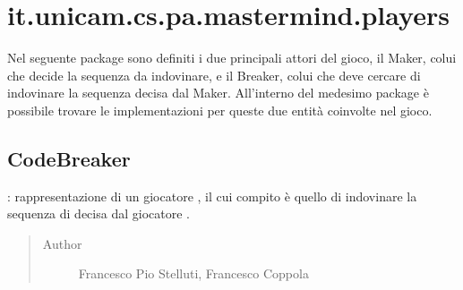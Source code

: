 \documentclass[letterpaper,10pt,italian,openany,oneside]{sphinxmanual}
\begin{document}
\section{it.unicam.cs.pa.mastermind.players}
\label{\detokenize{test/it/unicam/cs/pa/mastermind/players/package-index:it-unicam-cs-pa-mastermind-players}}\label{\detokenize{test/it/unicam/cs/pa/mastermind/players/package-index::doc}}
Nel seguente package sono definiti i due principali attori del gioco, il Maker, colui che decide la sequenza da indovinare, e il Breaker, colui che deve cercare di indovinare la sequenza decisa dal Maker. All’interno del medesimo package è possibile trovare le implementazioni per queste due entità coinvolte nel gioco.

\label{\detokenize{test/it/unicam/cs/pa/mastermind/players/package-index:package-it.unicam.cs.pa.mastermind.players}}

\subsection{CodeBreaker}
\label{\detokenize{test/it/unicam/cs/pa/mastermind/players/CodeBreaker:codebreaker}}\label{\detokenize{test/it/unicam/cs/pa/mastermind/players/CodeBreaker::doc}}

\begin{fulllineitems}
\label{\detokenize{test/it/unicam/cs/pa/mastermind/players/CodeBreaker:it.unicam.cs.pa.mastermind.players.CodeBreaker}}
: rappresentazione di un giocatore , il cui compito è quello di indovinare la sequenza di  decisa dal giocatore .
\begin{quote}\begin{description}
\item[{Author}] \leavevmode
Francesco Pio Stelluti, Francesco Coppola

\end{description}\end{quote}

\end{fulllineitems}
\end{document}
